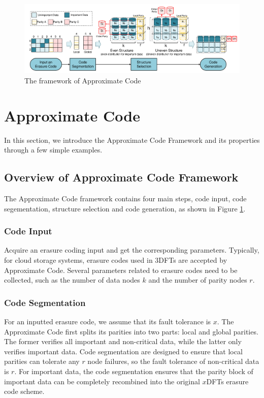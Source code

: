 \documentclass[sigconf]{acmart}
\begin{document}
\begin{figure}[ht!]
\centering
\includegraphics[width=0.95\linewidth]{photo/Framework-v3.pdf}
\caption{The framework of Approximate Code}
\label{fig-framework}
\end{figure}

\section{Approximate Code}\label{ApCode}
In this section, we introduce the Approximate Code Framework and its properties through a few simple examples.

\subsection{Overview of Approximate Code Framework}
The Approximate Code framework contains four main steps, code input, code segementation, structure selection and code generation, as shown in Figure \ref{fig-framework}.

\subsubsection{Code Input}
Acquire an erasure coding input and get the corresponding parameters. Typically, for cloud storage systems, erasure codes used in 3DFTs are accepted by Approximate Code. Several parameters related to erasure codes need to be collected, such as the number of data nodes $k$ and the number of parity nodes $r$.

\subsubsection{Code Segmentation}
For an inputted erasure code, we assume that its fault tolerance is $x$. The Approximate Code first splits its parities into two parts: local and global parities. The former verifies all important and non-critical data, while the latter only verifies important data. Code segmentation are designed to ensure that local parities can tolerate any $r$ node failures, so the fault tolerance of non-critical data is $r$. For important data, the code segmentation ensures that the parity block of important data can be completely recombined into the original $x$DFTs erasure code scheme.
\end{document}
